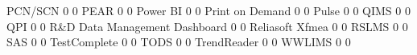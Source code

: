 \documentclass{article}
\begin{document}
\begin{Schunk}
\begin{Soutput}
  PCN/SCN                                                              0    0
  PEAR                                                                 0    0
  Power BI                                                             0    0
  Print on Demand                                                      0    0
  Pulse                                                                0    0
  QIMS                                                                 0    0
  QPI                                                                  0    0
  R&D Data Management Dashboard                                        0    0
  Reliasoft Xfmea                                                      0    0
  RSLMS                                                                0    0
  SAS                                                                  0    0
  TestComplete                                                         0    0
  TODS                                                                 0    0
  TrendReader                                                          0    0
  WWLIMS                                                               0    0
                                                           

\end{Soutput}
\end{Schunk}
\end{document}
